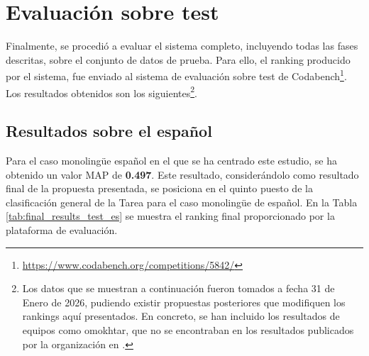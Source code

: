 \section{Evaluación sobre test}

\noindent Finalmente, se procedió a evaluar el sistema completo, incluyendo todas las fases descritas, sobre el conjunto de datos de prueba. Para ello, el ranking producido por el sistema, fue enviado al sistema de evaluación sobre test de Codabench\footnote{\url{https://www.codabench.org/competitions/5842/}}. Los resultados obtenidos son los siguientes\footnote{Los datos que se muestran a continuación fueron tomados a fecha 31 de Enero de 2026, pudiendo existir propuestas posteriores que modifiquen los rankings aquí presentados. En concreto, se han incluido los resultados de equipos como omokhtar, que no se encontraban en los resultados publicados por la organización en \cite{gasco2025overview}.}. 

\subsection{Resultados sobre el español}

\noindent Para el caso monolingüe español en el que se ha centrado este estudio, se ha obtenido un valor \gls{MAP} de \textbf{0.497}. Este resultado, considerándolo como resultado final de la propuesta presentada, se posiciona en el quinto puesto de la clasificación general de la \gls{Tarea} para el caso monolingüe de español. En la Tabla \ref{tab:final_results_test_es} se muestra el ranking final proporcionado por la plataforma de evaluación.

